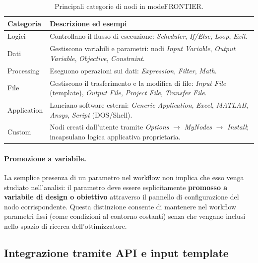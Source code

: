 \begin{table}[H]
    \centering
    \caption{Principali categorie di nodi in modeFRONTIER.}
    \label{tab:nodi_modefrontier}
    \begin{tabular}{lp{9cm}}
        \hline
        \textbf{Categoria} & \textbf{Descrizione ed esempi} \\
        \hline
        Logici & Controllano il flusso di esecuzione: \textit{Scheduler},
                 \textit{If/Else}, \textit{Loop}, \textit{Exit}. \\
        Dati & Gestiscono variabili e parametri: nodi
               \textit{Input Variable}, \textit{Output Variable},
               \textit{Objective}, \textit{Constraint}. \\
        Processing & Eseguono operazioni sui dati: \textit{Expression},
                     \textit{Filter}, \textit{Math}. \\
        File & Gestiscono il trasferimento e la modifica di file:
               \textit{Input File} (template), \textit{Output File},
               \textit{Project File}, \textit{Transfer File}. \\
        Application & Lanciano software esterni: \textit{Generic Application},
                      \textit{Excel}, \textit{MATLAB}, \textit{Ansys},
                      \textit{Script} (DOS/Shell). \\
        Custom & Nodi creati dall'utente tramite \textit{Options}
                 $\to$ \textit{MyNodes} $\to$ \textit{Install};
                 incapsulano logica applicativa proprietaria. \\
        \hline
    \end{tabular}
\end{table}

\paragraph{Promozione a variabile.}
La semplice presenza di un parametro nel workflow non implica che esso
venga studiato nell'analisi: il parametro deve essere esplicitamente
\textbf{promosso a variabile di design o obiettivo} attraverso il
pannello di configurazione del nodo corrispondente.
Questa distinzione consente di mantenere nel workflow parametri fissi
(come condizioni al contorno costanti) senza che vengano inclusi nello
spazio di ricerca dell'ottimizzatore.

\subsection{Integrazione tramite API e input template}


